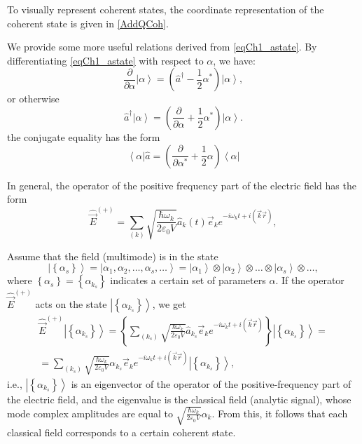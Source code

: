 To visually represent coherent states, the coordinate representation of the coherent state is given in \autoref{AddQCoh}.

We provide some more useful relations derived from \eqref{eqCh1_astate}. By differentiating \eqref{eqCh1_astate} with respect to  $\alpha$,
we have:
\[
\frac{\partial}{\partial \alpha}\left|\alpha\right> = 
\left( \hat{a}^{\dag} - \frac{1}{2}\alpha^{*}\right)\left|\alpha\right>,
\]
or otherwise 
\[
\hat{a}^{\dag}\left|\alpha\right> = \left(\frac{\partial}{\partial
  \alpha} +  \frac{1}{2}\alpha^{*}\right)\left|\alpha\right>.
\]
the conjugate equality has the form
\[
\left<\alpha\right|\hat{a} = \left(\frac{\partial}{\partial
  \alpha^{*}} +  \frac{1}{2}\alpha\right)\left<\alpha\right|
\]

In general, the operator of the positive frequency part of the electric field has the form
\[
\hat{\vec{E}}^{(+)} = \sum_{(k)} \sqrt{\frac{\hbar \omega_k}{2 \varepsilon_0
V}} \hat{a}_k\left(t\right) \vec{e}_k e^{-i \omega_k t + i \left(\vec{k}\vec{r}
  \right)}, 
\]

Assume that the field (multimode) is in the state
\[
\left| \left\{\alpha_s\right\}\right> = 
\left| \alpha_1, \alpha_2, \dots, \alpha_s, \dots\right> = 
\left| \alpha_1\right>
\otimes
\left| \alpha_2\right>
\otimes
\dots
\otimes
\left| \alpha_s\right>
\otimes
\dots,
\]
where $\left\{\alpha_s\right\}= \left\{\alpha_{k_s}\right\}$
indicates a certain set of parameters $\alpha$. If the operator $\hat{\vec{E}}^{(+)}$ acts on the state  $\left|\left\{\alpha_{k_s}\right\}\right>$,  we get 
\begin{eqnarray}
\hat{\vec{E}}^{(+)}\left|\left\{\alpha_{k_s}\right\}\right> = 
\left\{ \sum_{(k_s)} \sqrt{\frac{\hbar \omega_k}{2 \varepsilon_0
V}} \hat{a}_{k_s} \vec{e}_k e^{-i \omega_k t + i \left(\vec{k}\vec{r}
  \right)}\right\}\left|\left\{\alpha_{k_s}\right\}\right> = 
\nonumber \\
= 
\sum_{(k_s)} \sqrt{\frac{\hbar \omega_k}{2 \varepsilon_0
V}} \alpha_{k_s} \vec{e}_k e^{-i \omega_k t + i \left(\vec{k}\vec{r}
  \right)}\left|\left\{\alpha_{k_s}\right\}\right>,
\end{eqnarray}
i.e., $\left|\left\{\alpha_{k_s}\right\}\right>$  is an eigenvector of the operator of the positive-frequency part of the electric field, and
the eigenvalue is the classical field (analytic signal), whose mode complex amplitudes are equal to  
\(
\sqrt{\frac{\hbar \omega_k}{2 \varepsilon_0
V}} \alpha_k.
\)
From this, it follows that each classical field corresponds to a certain coherent state.

